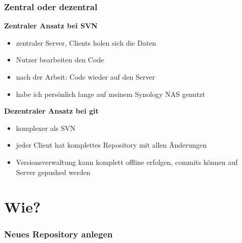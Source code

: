 \documentclass[12pt,ngerman]{beamer}
\begin{document}
\begin{frame}
\frametitle{Zentral oder dezentral}

{\bfseries Zentraler Ansatz bei SVN}

\begin{itemize}
	\item zentraler Server, Clients holen sich die Daten
	\item Nutzer bearbeiten den Code
	\item nach der Arbeit: Code wieder auf den Server
	\item habe ich persönlich lange auf meinem Synology NAS genutzt
\end{itemize}

{\bfseries Dezentraler Ansatz bei git}

\begin{itemize}
	\item komplexer als SVN
	\item jeder Client hat komplettes Repository mit allen Änderungen
	\item Versionsverwaltung kann komplett offline erfolgen, commits können auf Server gepushed werden
\end{itemize}

\end{frame}

\section{Wie?}

\begin{frame}
\frametitle{Neues Repository anlegen}

\begin{center}
\end{center}

\end{frame}
\end{document}
